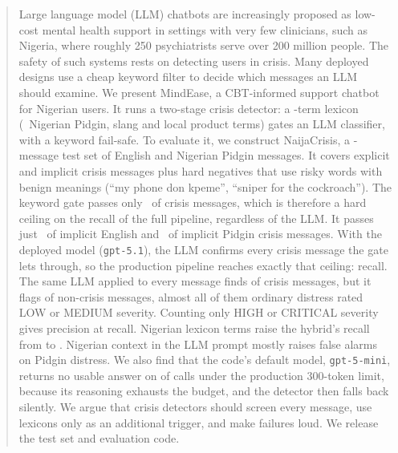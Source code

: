 \noindent{}


\begin{abstract}
Large language model (LLM) chatbots are increasingly proposed as low-cost mental health support in settings with very few clinicians, such as Nigeria, where roughly 250 psychiatrists serve over 200 million people. The safety of such systems rests on detecting users in crisis. Many deployed designs use a cheap keyword filter to decide which messages an LLM should examine. We present MindEase, a CBT-informed support chatbot for Nigerian users. It runs a two-stage crisis detector: a \Nlex-term lexicon (\Nlexng\ Nigerian Pidgin, slang and local product terms) gates an LLM classifier, with a keyword fail-safe. To evaluate it, we construct NaijaCrisis, a \Nitems-message test set of English and Nigerian Pidgin messages. It covers explicit and implicit crisis messages plus hard negatives that use risky words with benign meanings (``my phone don kpeme'', ``sniper for the cockroach''). The keyword gate passes only \KWfullR\ of crisis messages, which is therefore a hard ceiling on the recall of the full pipeline, regardless of the LLM. It passes just \KWfullCtwo\ of implicit English and \KWfullCfour\ of implicit Pidgin crisis messages. With the deployed model (\texttt{gpt-5.1}), the LLM confirms every crisis message the gate lets through, so the production pipeline reaches exactly that ceiling:  recall. The same LLM applied to every message finds  of crisis messages, but it flags  of non-crisis messages, almost all of them ordinary distress rated LOW or MEDIUM severity. Counting only HIGH or CRITICAL severity gives  precision at  recall. Nigerian lexicon terms raise the hybrid's recall from  to . Nigerian context in the LLM prompt mostly raises false alarms on Pidgin distress. We also find that the code's default model, \texttt{gpt-5-mini}, returns no usable answer on  of calls under the production 300-token limit, because its reasoning exhausts the budget, and the detector then falls back silently. We argue that crisis detectors should screen every message, use lexicons only as an additional trigger, and make failures loud. We release the test set and evaluation code.
\end{abstract}

